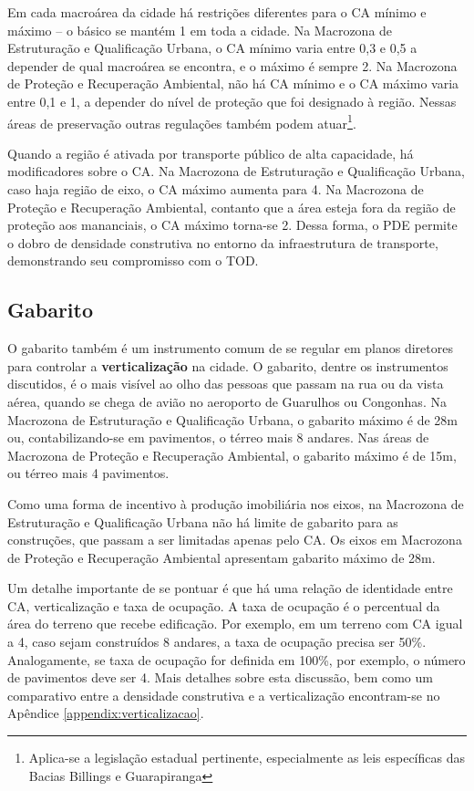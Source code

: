 Em cada macroárea da cidade há restrições diferentes para o CA mínimo e máximo -- o básico se mantém 1 em toda a cidade. Na Macrozona de Estruturação e Qualificação Urbana, o CA mínimo varia entre 0,3 e 0,5 a depender de qual macroárea se encontra, e o máximo é sempre 2. Na Macrozona de Proteção e Recuperação Ambiental, não há CA mínimo e o CA máximo varia entre 0,1 e 1, a depender do nível de proteção que foi designado à região. Nessas áreas de preservação outras regulações também podem atuar\footnote{Aplica-se a legislação estadual pertinente, especialmente as leis específicas das Bacias Billings e Guarapiranga}.

Quando a região é ativada por transporte público de alta capacidade, há modificadores sobre o CA. Na Macrozona de Estruturação e Qualificação Urbana, caso haja região de eixo, o CA máximo aumenta para 4. Na Macrozona de Proteção e Recuperação Ambiental, contanto que a área esteja fora da região de proteção aos mananciais, o CA máximo torna-se 2. Dessa forma, o PDE permite o dobro de densidade construtiva no entorno da infraestrutura de transporte, demonstrando seu compromisso com o TOD.

\subsection*{Gabarito}

O gabarito também é um instrumento comum de se regular em planos diretores para controlar a \textbf{verticalização} na cidade. O gabarito, dentre os instrumentos discutidos, é o mais visível ao olho das pessoas que passam na rua ou da vista aérea, quando se chega de avião no aeroporto de Guarulhos ou Congonhas. Na Macrozona de Estruturação e Qualificação Urbana, o gabarito máximo é de 28m ou, contabilizando-se em pavimentos, o térreo mais 8 andares. Nas áreas de Macrozona de Proteção e Recuperação Ambiental, o gabarito máximo é de 15m, ou térreo mais 4 pavimentos.

Como uma forma de incentivo à produção imobiliária nos eixos, na Macrozona de Estruturação e Qualificação Urbana não há limite de gabarito para as construções, que passam a ser limitadas apenas pelo CA. Os eixos em Macrozona de Proteção e Recuperação Ambiental apresentam gabarito máximo de 28m.

Um detalhe importante de se pontuar é que há uma relação de identidade entre CA, verticalização e taxa de ocupação. A taxa de ocupação é o percentual da área do terreno que recebe edificação. Por exemplo, em um terreno com CA igual a 4, caso sejam construídos 8 andares, a taxa de ocupação precisa ser 50\%. Analogamente, se taxa de ocupação for definida em 100\%, por exemplo, o número de pavimentos deve ser 4. Mais detalhes sobre esta discussão, bem como um comparativo entre a densidade construtiva e a verticalização encontram-se no Apêndice \ref{appendix:verticalizacao}.

